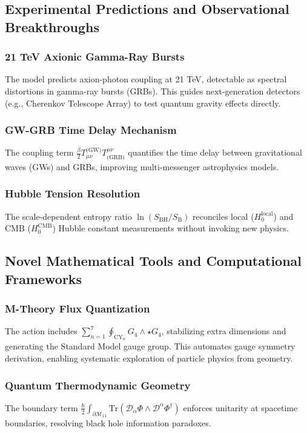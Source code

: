 \documentclass[12pt, a4paper]{article}
\begin{document}
\subsection{Experimental Predictions and Observational Breakthroughs}
\subsubsection{21 TeV Axionic Gamma-Ray Bursts}
The model predicts axion-photon coupling at 21 TeV, detectable as spectral distortions in gamma-ray bursts (GRBs). This guides next-generation detectors (e.g., Cherenkov Telescope Array) to test quantum gravity effects directly.

\subsubsection{GW-GRB Time Delay Mechanism}
The coupling term \( \frac{\beta}{2} T_{\mu\nu}^{\text{(GW)}} T^{\mu\nu}_{\text{(GRB)}} \) quantifies the time delay between gravitational waves (GWs) and GRBs, improving multi-messenger astrophysics models.

\subsubsection{Hubble Tension Resolution}
The scale-dependent entropy ratio \( \ln(S_{\text{BH}}/S_{\text{B}}) \) reconciles local (\( H_0^{\text{local}} \)) and CMB (\( H_0^{\text{CMB}} \)) Hubble constant measurements without invoking new physics.

\subsection{Novel Mathematical Tools and Computational Frameworks}
\subsubsection{M-Theory Flux Quantization}
The action includes \( \sum_{n=1}^7 \oint_{\text{CY}_n} G_4 \wedge \star G_4 \), stabilizing extra dimensions and generating the Standard Model gauge group. This automates gauge symmetry derivation, enabling systematic exploration of particle physics from geometry.

\subsubsection{Quantum Thermodynamic Geometry}
The boundary term \( \frac{\hbar}{2} \int_{\partial\mathcal{M}_{11}} \text{Tr}(\mathcal{D}_\alpha \Phi \wedge \mathcal{D}^\alpha \Phi^\dagger) \) enforces unitarity at spacetime boundaries, resolving black hole information paradoxes.
\end{document}

